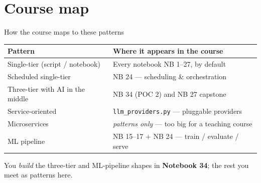 \documentclass[aspectratio=169,11pt]{beamer}
\begin{document}
\section{Course map}
\begin{frame}{How the course maps to these patterns}
  \small
  \begin{center}
  \begin{tabular}{ll}
    \toprule
    \textbf{Pattern} & \textbf{Where it appears in the course} \\
    \midrule
    Single-tier (script / notebook) & Every notebook NB 1--27, by default \\
    Scheduled single-tier           & NB 24 --- scheduling \& orchestration \\
    Three-tier with AI in the middle& NB 34 (POC 2) and NB 27 capstone \\
    Service-oriented                & \texttt{llm\_providers.py} --- pluggable providers \\
    Microservices                   & \emph{patterns only} --- too big for a teaching course \\
    ML pipeline                     & NB 15--17 $+$ NB 24 --- train / evaluate / serve \\
    \bottomrule
  \end{tabular}
  \end{center}
  \vspace{4pt}
  {\footnotesize You \emph{build} the three-tier and ML-pipeline shapes in \textbf{Notebook 34}; the rest you meet as patterns here.}
\end{frame}
\end{document}
